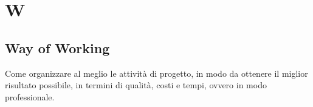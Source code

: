 \section{W}

    \subsection{Way of Working}
    \label{glossario:wayofworking}
    Come organizzare al meglio le attività di progetto, in modo da ottenere il miglior risultato possibile, in termini di qualità, costi e tempi, ovvero in modo professionale.

\pagebreak